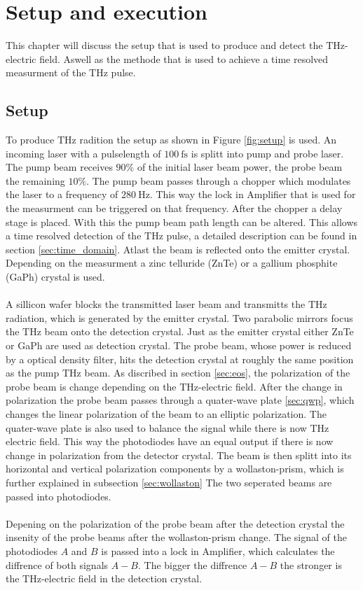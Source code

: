 \chapter{Setup and execution}
This chapter will discuss the setup that is used to produce and detect the $\si{\tera\hertz}$-electric field.
Aswell as the methode that is used to achieve a time resolved measurment of the $\si{\tera\hertz}$ pulse.

\section{Setup}
\label{sec:setup}
To produce $\si{\tera\hertz}$ radition the setup as shown in Figure \ref{fig:setup} is used.
An incoming laser with a pulselength of $\SI{100}{\femto\second}$ is splitt into pump and probe laser.
The pump beam receives $90\%$ of the initial laser beam power, the probe beam the remaining $10\%$.
The pump beam passes through a chopper which modulates the laser to a frequency of $\SI{280}{\hertz}$.
This way the lock in Amplifier that is used for the measurment can be triggered on that frequency.
After the chopper a delay stage is placed.
With this the pump beam path length can be altered.
This allows a time resolved detection of the $\si{\tera\hertz}$ pulse, a detailed description can be found in section \ref{sec:time_domain}.
Atlast the beam is reflected onto the emitter crystal.
Depending on the measurment a zinc telluride (ZnTe) or a gallium phosphite (GaPh) crystal is used.
\\\\
A sillicon wafer blocks the transmitted laser beam and transmitts the $\si{\tera\hertz}$ radiation, which is generated by the emitter crystal.
Two parabolic mirrors focus the $\si{\tera\hertz}$ beam onto the detection crystal.
Just as the emitter crystal either ZnTe or GaPh are used as detection crystal.
The probe beam, whose power is reduced by a optical density filter, hits the detection crystal at roughly the same position as the pump $\si{\tera\hertz}$ beam.
As discribed in section \ref{sec:eos}, the polarization of the probe beam is change depending on the $\si{\tera\hertz}$-electric field.
After the change in polarization the probe beam passes through a quater-wave plate \ref{sec:qwp}, which changes the linear polarization of the beam to an elliptic polarization.
The quater-wave plate is also used to balance the signal while there is now $\si{\tera\hertz}$ electric field.
This way the photodiodes have an equal output if there is now change in polarization from the detector crystal.
The beam is then splitt into its horizontal and vertical polarization components by a wollaston-prism, which is further explained in subsection \ref{sec:wollaston}
The two seperated beams are passed into photodiodes.
\\\\
Depening on the polarization of the probe beam after the detection crystal the insenity of the probe beams after the wollaston-prism change.
The signal of the photodiodes $A$ and $B$ is passed into a lock in Amplifier, which calculates the diffrence of both signals $A-B$.
The bigger the diffrence $A-B$ the stronger is the $\si{\tera\hertz}$-electric field in the detection crystal.
\FloatBarrier
